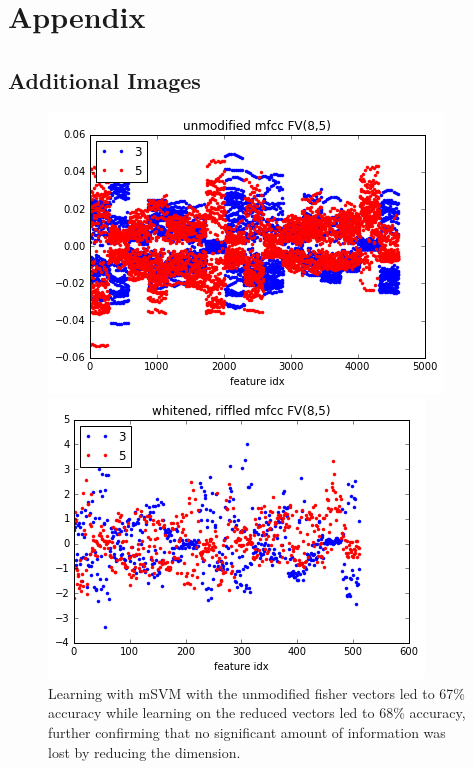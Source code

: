 \documentclass{article}
\begin{document}



\pagebreak
\section{Appendix}

\subsection{Additional Images}

\begin{figure}[H]
    \centering
    
    \begin{minipage}[b]{0.4\textwidth}
        \includegraphics[width=\textwidth]{unmodified-mfcc8-5.png}
    \end{minipage}
    \hfill
    \begin{minipage}[b]{0.4\textwidth}
        \includegraphics[width=\textwidth]{whitened-riffled-mfcc8-5.png}
    \end{minipage}
    
    \label{fig:fv85}
    \caption{
Learning with mSVM with the unmodified fisher vectors led to 67\% accuracy
while learning on the reduced vectors led to 68\% accuracy,
further confirming that no significant amount of information was lost by reducing
the dimension.}
\end{figure}
\end{document}
